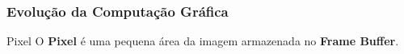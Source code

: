 \documentclass{beamer}
\begin{document}


\begin{frame}
\frametitle{Evolução da Computação Gráfica}

\begin{block} {Pixel}
	O \textbf{Pixel} é uma pequena área da imagem armazenada no \textbf{Frame Buffer}.
	
\end{block}

	\begin{figure}[!h]
		\begin{center}
			\qquad
      		\qquad
		\end{center}
		
	\end{figure}

\end{frame}

\end{document}
